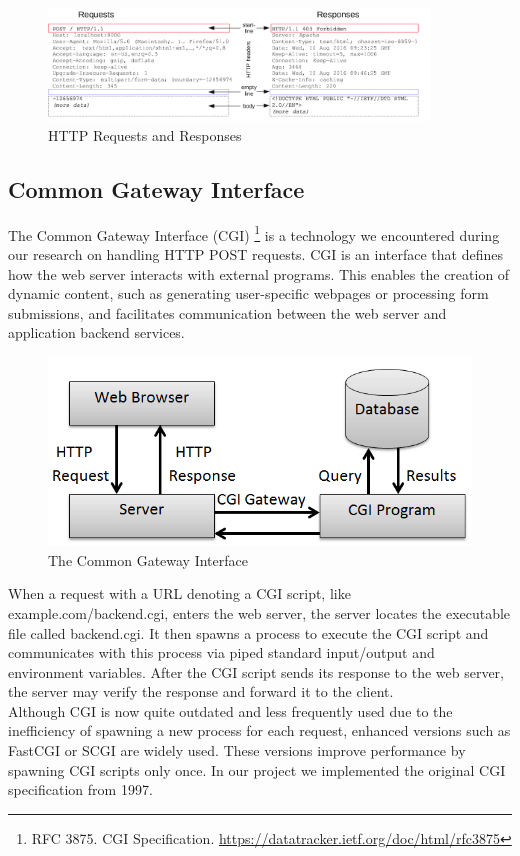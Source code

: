 \begin{figure}[h]
	\centering
	\includegraphics[width=0.9\textwidth]{figures/http_structure.png}
	\caption{HTTP Requests and Responses}
\end{figure}

\subsection*{Common Gateway Interface}
The Common Gateway Interface (CGI) \footnote{RFC 3875. CGI Specification. \url{https://datatracker.ietf.org/doc/html/rfc3875}} is a technology we encountered during our research on handling HTTP POST requests. CGI is an interface that defines how the web server interacts with external programs. This enables the creation of dynamic content, such as generating user-specific webpages or processing form submissions, and facilitates communication between the web server and application backend services.

\begin{figure}[h]
	\centering
	\includegraphics[width=\textwidth]{figures/Common-Gateway-Interface.png}
	\caption{The Common Gateway Interface}
\end{figure}

When a request with a URL denoting a CGI script, like example.com/backend.cgi, enters the web server, the server locates the executable file called backend.cgi. It then spawns a process to execute the CGI script and communicates with this process via piped standard input/output and environment variables. After the CGI script sends its response to the web server, the server may verify the response and forward it to the client.\\

Although CGI is now quite outdated and less frequently used due to the inefficiency of spawning a new process for each request, enhanced versions such as FastCGI or SCGI are widely used. These versions improve performance by spawning CGI scripts only once. In our project we implemented the original CGI specification from 1997.

